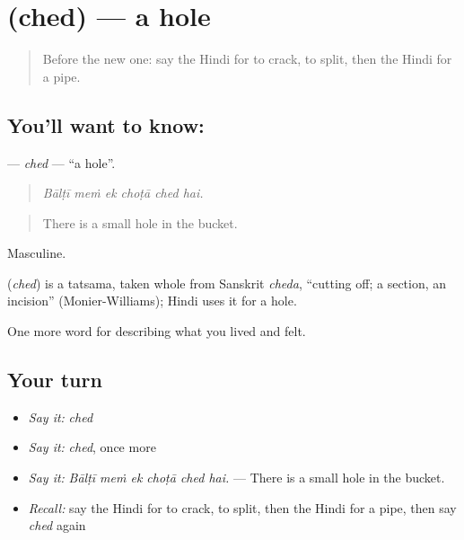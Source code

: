 \section[\texorpdfstring{\hi{छेद} (ched)}{छेद (ched)}]{ (ched) — a hole}

\label{lesson:HI-C516-ched}



\begin{quote}
Before the new one: say the Hindi for to crack, to split, then the Hindi for a pipe.
\end{quote}

\subsection*{You'll want to know: }
\textbf{} — \emph{ched} — \textquotedblleft{}a hole\textquotedblright{}.

\begin{quote}
     
\end{quote}

\begin{quote}
\emph{Bālṭī meṁ ek choṭā ched hai.}
\end{quote}

\begin{quote}
There is a small hole in the bucket.
\end{quote}

Masculine.

\begin{cousinweb}
\textbf{} (\emph{ched}) is a tatsama, taken whole from Sanskrit \emph{cheda}, \textquotedblleft{}cutting off; a section, an incision\textquotedblright{} (Monier-Williams); Hindi uses it for a hole.
\end{cousinweb}

\begin{grammarlens}[title={What you've built}]
One more word for describing what you lived and felt.
\end{grammarlens}

\subsection*{Your turn}
\begin{itemize}
\raggedright
  \item \emph{Say it:} \emph{ched}
  \item \emph{Say it:} \emph{ched}, once more
  \item \emph{Say it:} \emph{Bālṭī meṁ ek choṭā ched hai.} — There is a small hole in the bucket.
  \item \emph{Recall:} say the Hindi for to crack, to split, then the Hindi for a pipe, then say \emph{ched} again
\end{itemize}

